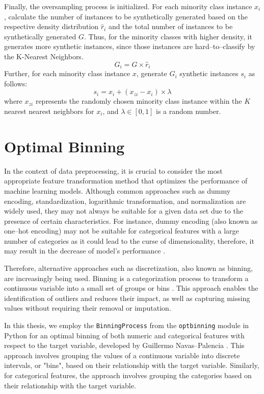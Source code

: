 Finally, the oversampling process is initialized.
For each minority class instance $x_i$, calculate the number of instances to be synthetically generated based on the respective density distribution $\hat{r}_i$ and the total number of instances to be synthetically generated $G$. Thus, for the minority classes with higher density, it generates more synthetic instances, since those instances are hard--to--classify by the K-Nearest Neighbors.
\begin{equation}\label{eq}
    G_i = G \times \hat{r}_{i}
\end{equation}
Further, for each minority class instance $x$, generate $G_i$ synthetic instances $s_i$ as follows:
\begin{equation}\label{eq}
    s_i = x_i + \left(x_{zi} - x_{i} \right) \times \lambda
\end{equation}
where $x_{zi}$ represents the randomly chosen minority class instance within the $K$ nearest nearest neighbors for $x_i$, and $\lambda \in \left[0,1\right]$ is a random number.

\newpage
\section{Optimal Binning}
\label{sec:optbinningtheory}
In the context of data preprocessing, it is crucial to consider the most appropriate feature transformation method that optimizes the performance of machine learning models.
Although common approaches such as dummy encoding, standardization, logarithmic transformation, and normalization are widely used, they may not always be suitable for a given data set due to the presence of certain characteristics.
For instance, dummy encoding (also known as one--hot encoding) may not be suitable for categorical features with a large number of categories as it could lead to the curse of dimensionality, therefore, it may result in the decrease of model's performance \citep{bera2021dimensionality}.

Therefore, alternative approaches such as discretization, also known as binning, are increasingly being used. Binning is a categorization process to transform a continuous variable into a small set of groups or bins \citep{zeng2014necessary}. This approach enables the identification of outliers and reduces their impact, as well as capturing missing values without requiring their removal or imputation.

In this thesis, we employ the \lstinline{BinningProcess} from the \lstinline{optbinning} module in Python for an optimal binning of both numeric and categorical features with respect to the target variable, developed by Guillermo Navas--Palencia \citep{navas2020optimal}. 
This approach involves grouping the values of a continuous variable into discrete intervals, or "bins", based on their relationship with the target variable.
Similarly, for categorical features, the approach involves grouping the categories based on their relationship with the target variable.

